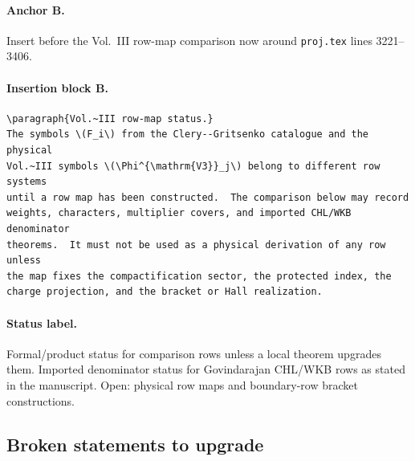 \paragraph{Anchor B.}
Insert before the Vol.~III row-map comparison now around
\texttt{proj.tex} lines 3221--3406.

\paragraph{Insertion block B.}
\begin{verbatim}
\paragraph{Vol.~III row-map status.}
The symbols \(F_i\) from the Clery--Gritsenko catalogue and the physical
Vol.~III symbols \(\Phi^{\mathrm{V3}}_j\) belong to different row systems
until a row map has been constructed.  The comparison below may record
weights, characters, multiplier covers, and imported CHL/WKB denominator
theorems.  It must not be used as a physical derivation of any row unless
the map fixes the compactification sector, the protected index, the
charge projection, and the bracket or Hall realization.
\end{verbatim}

\paragraph{Status label.}
Formal/product status for comparison rows unless a local theorem upgrades
them.  Imported denominator status for Govindarajan CHL/WKB rows as
stated in the manuscript.  Open: physical row maps and boundary-row
bracket constructions.

\subsection{Broken statements to upgrade}

